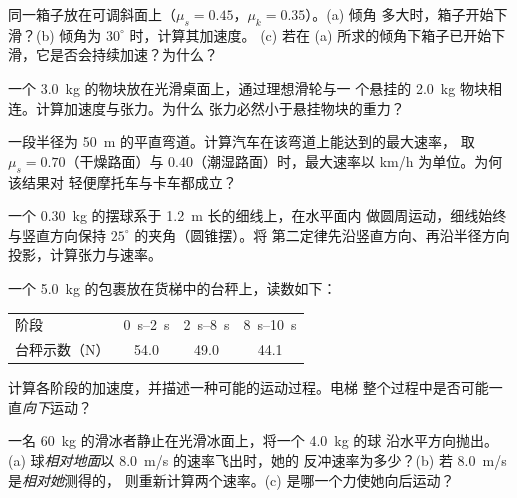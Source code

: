 \begin{exercise}[$\star\star$]\label{exo:g12:newtons-laws:7}
同一箱子放在可调斜面上（$\mu_s = 0.45$，$\mu_k = 0.35$）。(a) 倾角
多大时，箱子开始下滑？(b) 倾角为 $30^\circ$ 时，计算其加速度。
(c) 若在 (a) 所求的倾角下箱子已开始下滑，它是否会持续加速？为什么？
\end{exercise}

\begin{exercise}[$\star\star$]\label{exo:g12:newtons-laws:8}
一个 \qty{3.0}{kg} 的物块放在光滑桌面上，通过理想滑轮与一
个悬挂的 \qty{2.0}{kg} 物块相连。计算加速度与张力。为什么
张力必然小于悬挂物块的重力？
\end{exercise}

\begin{exercise}[$\star\star$]\label{exo:g12:newtons-laws:9}
一段半径为 \qty{50}{m} 的平直弯道。计算汽车在该弯道上能达到的最大速率，
取 $\mu_s = 0.70$（干燥路面）与 $0.40$（潮湿路面）时，最大速率以 \unit{km/h} 为单位。为何该结果对
轻便摩托车与卡车都成立？
\end{exercise}

\begin{exercise}[$\star\star$]\label{exo:g12:newtons-laws:10}
一个 \qty{0.30}{kg} 的摆球系于 \qty{1.2}{m} 长的细线上，在水平面内
做圆周运动，细线始终与竖直方向保持 $25^\circ$ 的夹角（圆锥摆）。将
第二定律先沿竖直方向、再沿半径方向投影，计算张力与速率。
\end{exercise}

\begin{exercise}[$\star\star$]\label{exo:g12:newtons-laws:11}
一个 \qty{5.0}{kg} 的包裹放在货梯中的台秤上，读数如下：
\begin{center}\small\begin{tabular}{lccc}
阶段 & \qtyrange{0}{2}{s} & \qtyrange{2}{8}{s} & \qtyrange{8}{10}{s}\\
台秤示数（\unit{N}） & 54.0 & 49.0 & 44.1
\end{tabular}\end{center}
计算各阶段的加速度，并描述一种可能的运动过程。电梯
整个过程中是否可能一直\emph{向下}运动？
\end{exercise}

\begin{exercise}[$\star\star\star$]\label{exo:g12:newtons-laws:12}
一名 \qty{60}{kg} 的滑冰者静止在光滑冰面上，将一个 \qty{4.0}{kg} 的球
沿水平方向抛出。(a) 球\emph{相对地面}以 \qty{8.0}{m/s} 的速率飞出时，她的
反冲速率为多少？(b) 若 \qty{8.0}{m/s} 是\emph{相对她}测得的，
则重新计算两个速率。(c) 是哪一个力使她向后运动？
\end{exercise}

